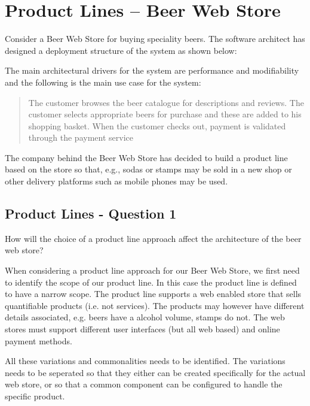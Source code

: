\section{Product Lines -- Beer Web Store}
Consider a Beer Web Store for buying speciality beers. The software
architect has designed a deployment structure of the system as shown
below:
\begin{figure}[h!]
  \centerline{}
  \label{fig:observation}
\end{figure}
The main architectural drivers for the system are performance and
modifiability and the following is the main use case for the system:
\begin{quote}
  The customer browses the beer catalogue for descriptions and
  reviews. The customer selects appropriate beers for purchase and
  these are added to his shopping basket. When the customer checks
  out, payment is validated through the payment service
\end{quote}

The company behind the Beer Web Store has decided to build a product
line based on the store so that, e.g., sodas or stamps may be sold in
a new shop or other delivery platforms such as mobile phones may be
used.

\subsection{Product Lines - Question 1}

\begin{question}
How will the choice of a product line approach affect the
architecture of the beer web store?
\end{question}

When considering a product line approach for our Beer Web Store, we first need to identify the scope of our product line. In this case the product line is defined to have a narrow scope. The product line supports a web enabled store that sells quantifiable products (i.e. not services). The products may however have different details associated, e.g. beers have a alcohol volume, stamps do not. The web stores must support different user interfaces (but all web based) and online payment methods.

All these variations and commonalities needs to be identified. The variations needs to be seperated so that they either can be created specifically for the actual web store, or so that a common component can be configured to handle the specific product.

